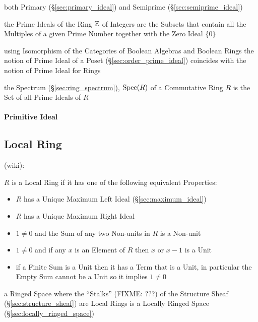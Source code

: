 both Primary (\S\ref{sec:primary_ideal}) and Semiprime
(\S\ref{sec:semiprime_ideal})

the Prime Ideals of the Ring $\mathbb{Z}$ of Integers are the Subsets that contain
all the Multiples of a given Prime Number together with the Zero Ideal $\{0\}$

\fist using Isomorphism of the Categories of Boolean Algebras and Boolean Rings
the notion of Prime Ideal of a Poset (\S\ref{sec:order_prime_ideal}) coincides
with the notion of Prime Ideal for Rings

the Spectrum (\S\ref{sec:ring_spectrum}), $\mathrm{Spec}(R)$ of a Commutative Ring $R$
is the Set of all Prime Ideals of $R$



\paragraph{Primitive Ideal}\label{sec:primitive_ideal}\hfill



\subsection{Local Ring}\label{sec:local_ring}

(wiki):

$R$ is a Local Ring if it has one of the following equivalent Properties:
\begin{itemize}
  \item $R$ has a Unique Maximum Left Ideal (\S\ref{sec:maximum_ideal})
  \item $R$ has a Unique Maximum Right Ideal
  \item $1 \neq 0$ and the Sum of any two Non-units in $R$ is a Non-unit
  \item $1 \neq 0$ and if any $x$ is an Element of $R$ then $x$ or $x - 1$ is a
    Unit
  \item if a Finite Sum is a Unit then it has a Term that is a Unit, in
    particular the Empty Sum cannot be a Unit so it implies $1 \neq 0$
\end{itemize}

a Ringed Space where the ``Stalks'' (FIXME: ???) of the Structure Sheaf
(\S\ref{sec:structure_sheaf}) are Local Rings is a Locally Ringed Space
(\S\ref{sec:locally_ringed_space})



